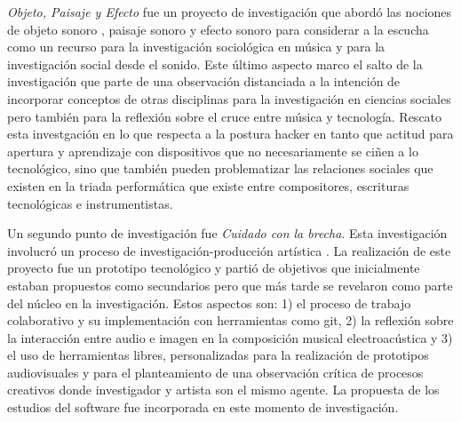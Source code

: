 
\emph{Objeto, Paisaje y Efecto}\citep{ocelotlLic} fue un proyecto de investigación que abordó las nociones de objeto sonoro \citep{schaeffer}, paisaje sonoro\citep{schafer1} y efecto sonoro \citep{augoyard} para considerar a la escucha como un recurso para la investigación sociológica en música y para la investigación social desde el sonido. Este último aspecto marco el salto de la investigación que parte de una observación distanciada a la intención de incorporar conceptos de otras disciplinas para la investigación en ciencias sociales pero también para la reflexión sobre el cruce entre música y tecnología. Rescato esta investgación en lo que respecta a la postura hacker en tanto que actitud para apertura y aprendizaje con dispositivos que no necesariamente se ciñen a lo tecnológico, sino que también pueden problematizar las relaciones sociales que existen en la triada performática que existe entre compositores, escrituras tecnológicas e instrumentistas.  


Un segundo punto de investigación fue \emph{Cuidado con la brecha}. Esta investigación involucró un proceso de investigación-producción artística \citep{ocelotlMas}. La realización de este proyecto fue un prototipo tecnológico y partió de objetivos que inicialmente estaban propuestos como secundarios pero que más tarde se revelaron como parte del núcleo en la investigación. Estos aspectos son: 1) el proceso de trabajo colaborativo y su implementación con herramientas como git, 2) la reflexión sobre la interacción entre audio e imagen en la composición musical electroacústica y 3) el uso de herramientas libres, personalizadas para la realización de prototipos audiovisuales y para el planteamiento de una observación crítica de procesos creativos donde investigador y artista son el mismo agente. La propuesta de los estudios del software fue incorporada en este momento de investigación. 


